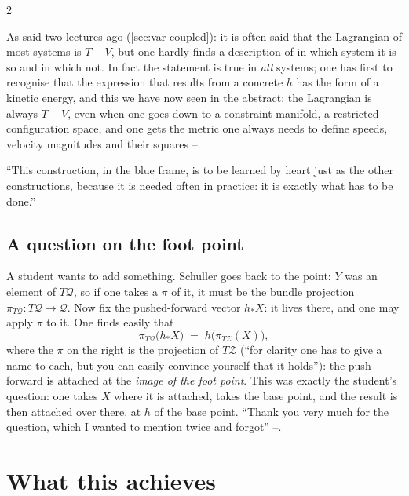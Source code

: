 \begin{paracol}{2}
\begin{intuition}[It is again a kinetic energy: $L=T-V$ is always true]
As said two lectures ago (\cref{sec:var-coupled}): it is often said that the Lagrangian of most systems is $T-V$, but one hardly finds a description of in which system it is so and in which not. In fact the statement is true in \emph{all} systems; one has first to recognise that the expression that results from a concrete $h$ has the form of a kinetic energy, and this we have now seen in the abstract: the Lagrangian is always $T-V$, even when one goes down to a constraint manifold, a restricted configuration space, and one gets the metric one always needs to define speeds, velocity magnitudes and their squares --.
\end{intuition}

``This construction, in the blue frame, is to be learned by heart just as the other constructions, because it is needed often in practice: it is exactly what has to be done.'' 

\subsection{A question on the foot point}\label{ssec:zw-foot}

A student wants to add something. Schuller goes back to the point: $Y$ was an element of $T\mathcal Q$, so if one takes a $\pi$ of it, it must be the bundle projection $\pi_{T\mathcal Q}\colon T\mathcal Q\to\mathcal Q$. Now fix the pushed-forward vector $h_*X$: it lives there, and one may apply $\pi$ to it. One finds easily that
\begin{equation}\label{eq:zw-foot}
  \pi_{T\mathcal Q}\bigl(h_*X\bigr)\;=\;h\bigl(\pi_{T\mathcal Z}(X)\bigr),
\end{equation}
where the $\pi$ on the right is the projection of $T\mathcal Z$ (``for clarity one has to give a name to each, but you can easily convince yourself that it holds''): the push-forward is attached at the \emph{image of the foot point}. This was exactly the student's question: one takes $X$ where it is attached, takes the base point, and the result is then attached over there, at $h$ of the base point. ``Thank you very much for the question, which I wanted to mention twice and forgot'' --.

\section{What this achieves}\label{sec:zw-wrapup}


\end{paracol}
